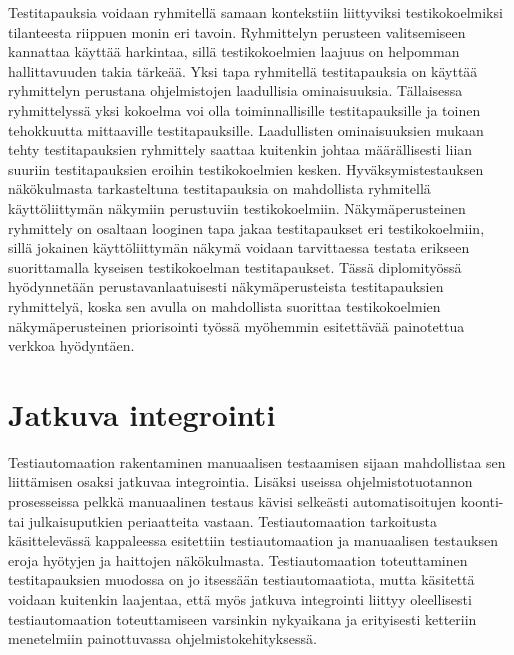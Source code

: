   Testitapauksia voidaan ryhmitellä samaan kontekstiin liittyviksi testikokoelmiksi tilanteesta riippuen monin eri tavoin.
  Ryhmittelyn perusteen valitsemiseen kannattaa käyttää harkintaa, sillä testikokoelmien laajuus on helpomman hallittavuuden takia tärkeää.
  Yksi tapa ryhmitellä testitapauksia on käyttää ryhmittelyn perustana ohjelmistojen laadullisia ominaisuuksia.
  Tällaisessa ryhmittelyssä yksi kokoelma voi olla toiminnallisille testitapauksille ja toinen tehokkuutta mittaaville testitapauksille.
  Laadullisten ominaisuuksien mukaan tehty testitapauksien ryhmittely saattaa kuitenkin johtaa määrällisesti liian suuriin testitapauksien eroihin testikokoelmien kesken.
  Hyväksymistestauksen näkökulmasta tarkasteltuna testitapauksia on mahdollista ryhmitellä käyttöliittymän näkymiin perustuviin testikokoelmiin.
  Näkymäperusteinen ryhmittely on osaltaan looginen tapa jakaa testitapaukset eri testikokoelmiin, sillä jokainen käyttöliittymän näkymä voidaan tarvittaessa testata erikseen suorittamalla kyseisen testikokoelman testitapaukset.
  Tässä diplomityössä hyödynnetään perustavanlaatuisesti näkymäperusteista testitapauksien ryhmittelyä, koska sen avulla on mahdollista suorittaa testikokoelmien näkymäperusteinen priorisointi työssä myöhemmin esitettävää painotettua verkkoa hyödyntäen.

\section{Jatkuva integrointi} \label{ch:07_jatkuva_integrointi}

  Testiautomaation rakentaminen manuaalisen testaamisen sijaan mahdollistaa sen liittämisen osaksi jatkuvaa integrointia.
  Lisäksi useissa ohjelmistotuotannon prosesseissa pelkkä manuaalinen testaus kävisi selkeästi automatisoitujen koonti- tai julkaisuputkien periaatteita vastaan.
  Testiautomaation tarkoitusta käsittelevässä kappaleessa esitettiin testiautomaation ja manuaalisen testauksen eroja hyötyjen ja haittojen näkökulmasta.
  Testiautomaation toteuttaminen testitapauksien muodossa on jo itsessään testiautomaatiota, mutta käsitettä voidaan kuitenkin laajentaa, että myös jatkuva integrointi liittyy oleellisesti testiautomaation toteuttamiseen varsinkin nykyaikana ja erityisesti ketteriin menetelmiin painottuvassa ohjelmistokehityksessä.

